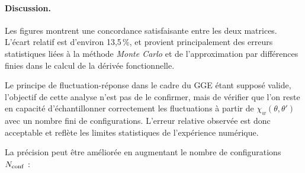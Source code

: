 \paragraph{Discussion.}

Les figures montrent une concordance satisfaisante entre les deux matrices. L’écart relatif est d’environ 13,5\,\%, et provient principalement des erreurs statistiques liées à la méthode \emph{Monte Carlo} et de l’approximation par différences finies dans le calcul de la dérivée fonctionnelle.

\medskip

Le principe de fluctuation-réponse dans le cadre du \gls{GGE} étant supposé valide, l’objectif de cette analyse n’est pas de le confirmer, mais de vérifier que l’on reste en capacité d’échantillonner correctement les fluctuations à partir de \(\chi_w(\theta,\theta')\) avec un nombre fini de configurations. L’erreur relative observée est donc acceptable et reflète les limites statistiques de l’expérience numérique.

\medskip

La précision peut être améliorée en augmentant le nombre de configurations \(N_{\rm conf}\) :


